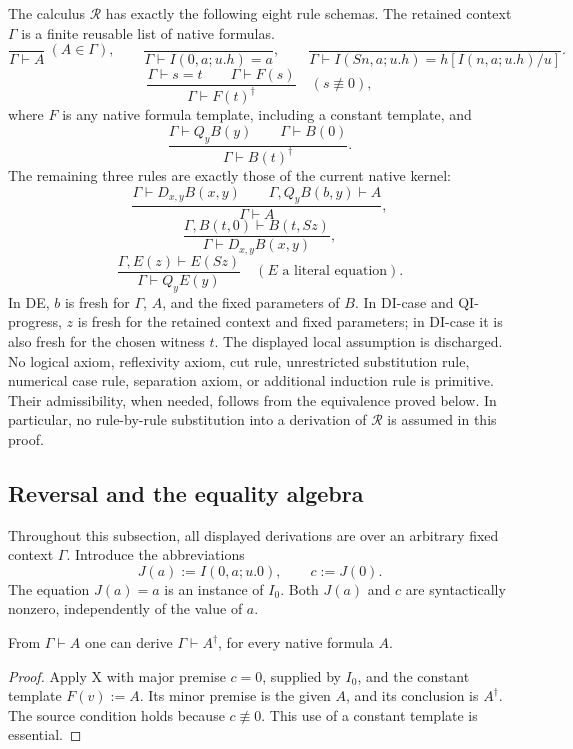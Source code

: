 The calculus $\mathcal R$ has exactly the following eight rule schemas.
The retained context $\Gamma$ is a finite reusable list of native
formulas.
\[
 \frac{}{\Gamma\vdash A}\ (A\in\Gamma),\qquad
 \frac{}{\Gamma\vdash I(0,a;u.h)=a},\qquad
 \frac{}{\Gamma\vdash I(Sn,a;u.h)=h[I(n,a;u.h)/u]}.
 \tag{Hyp, $I_0$, $I_S$}\label{rev:initial}
\]
\[
 \frac{\Gamma\vdash s=t\qquad\Gamma\vdash F(s)}
      {\Gamma\vdash F(t)^\dagger}
 \quad(s\not\equiv0),
 \tag{X}\label{rev:x}
\]
where $F$ is any native formula template, including a constant template,
and
\[
 \frac{\Gamma\vdash Q_yB(y)\qquad\Gamma\vdash B(0)}
      {\Gamma\vdash B(t)^\dagger}.
 \tag{QX}\label{rev:qx}
\]
The remaining three rules are exactly those of the current native kernel:
\[
 \frac{\Gamma\vdash D_{x,y}B(x,y)
       \qquad\Gamma,Q_yB(b,y)\vdash A}
      {\Gamma\vdash A},
 \tag{DE}\label{rev:de}
\]
\[
 \frac{\Gamma,B(t,0)\vdash B(t,Sz)}
      {\Gamma\vdash D_{x,y}B(x,y)},
 \tag{DI-case}\label{rev:di}
\]
\[
 \frac{\Gamma,E(z)\vdash E(Sz)}
      {\Gamma\vdash Q_yE(y)}
 \quad(E\text{ a literal equation}).
 \tag{QI-progress}\label{rev:qi}
\]
In DE, $b$ is fresh for $\Gamma$, $A$, and the fixed parameters of $B$.
In DI-case and QI-progress, $z$ is fresh for the retained context and
fixed parameters; in DI-case it is also fresh for the chosen witness
$t$. The displayed local assumption is discharged. No logical axiom,
reflexivity axiom, cut rule, unrestricted substitution rule, numerical
case rule, separation axiom, or additional induction rule is primitive.
Their admissibility, when needed, follows from the equivalence proved
below. In particular, no rule-by-rule substitution into a derivation of
$\mathcal R$ is assumed in this proof.

\subsection{Reversal and the equality algebra}

Throughout this subsection, all displayed derivations are over an
arbitrary fixed context $\Gamma$. Introduce the abbreviations
\[
             J(a):=I(0,a;u.0),\qquad c:=J(0).
 \label{rev:j}
\]
The equation $J(a)=a$ is an instance of $I_0$. Both $J(a)$ and $c$
are syntactically nonzero, independently of the value of $a$.

\begin{lemma}\label{rev:reverse}
From $\Gamma\vdash A$ one can derive $\Gamma\vdash A^\dagger$,
for every native formula $A$.
\end{lemma}
\begin{proof}
Apply X with major premise $c=0$, supplied by $I_0$, and the constant
template $F(v):=A$. Its minor premise is the given $A$, and its
conclusion is $A^\dagger$. The source condition holds because
$c\not\equiv0$. This use of a constant template is essential.
\end{proof}

